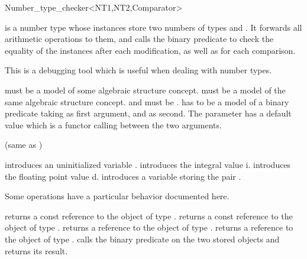 
\begin{ccRefClass} {Number_type_checker<NT1,NT2,Comparator>}

\ccDefinition
{} is a number type whose instances store two numbers
of types  and .  It forwards all arithmetic operations to
them, and calls the binary predicate  to check the equality of
the instances after each modification, as well as for each comparison.

This is a debugging tool which is useful when dealing with number types.

\ccParameters

 must be a model of some algebraic structure concept. 
 must be a model of the same algebraic structure concept.
 and  must be .
 has to be a model of a binary predicate taking 
as first argument, and  as second.  The  parameter
has a default value which is a functor calling  between
the two arguments.



\ccIsModel
{} (same as )\\
\ccCreation
{}

{introduces an uninitialized variable \ccVar.}
\ccGlue
{}
{introduces the integral value i.}
\ccGlue
{}
{introduces the floating point value d.}
\ccGlue
{}
{introduces a variable storing the pair .}

\ccOperations

Some operations have a particular behavior documented here.

{returns a const reference to the object of type .}
\ccGlue
{}
{returns a const reference to the object of type .}
\ccGlue
{}
{returns a reference to the object of type .}
\ccGlue
{}
{returns a reference to the object of type .}
\ccGlue
{}
{calls the  binary predicate on the two stored objects
 and returns its result.}


\end{ccRefClass}
